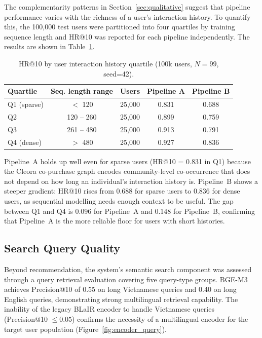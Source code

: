 The complementarity patterns in Section~\ref{sec:qualitative} suggest that pipeline performance varies with the richness of a user's interaction history.
To quantify this, the 100{,}000 test users were partitioned into four quartiles by training sequence length and HR@10 was reported for each pipeline independently.
The results are shown in Table~\ref{tab:perf_by_history}.

\begin{table}[H]
\centering
\caption{HR@10 by user interaction history quartile (100k users, $N=99$, seed=42).}
\label{tab:perf_by_history}
\begin{tabular}{lcccc}
\hline
\textbf{Quartile} & \textbf{Seq. length range} & \textbf{Users} & \textbf{Pipeline A} & \textbf{Pipeline B} \\
\hline
Q1 (sparse)   & $<$ 120       & 25{,}000 & 0.831 & 0.688 \\
Q2            & 120 -- 260    & 25{,}000 & 0.899 & 0.759 \\
Q3            & 261 -- 480    & 25{,}000 & 0.913 & 0.791 \\
Q4 (dense)    & $>$ 480       & 25{,}000 & 0.927 & 0.836 \\
\hline
\end{tabular}
\end{table}

Pipeline~A holds up well even for sparse users (HR@10 = 0.831 in Q1) because the Cleora co-purchase graph encodes community-level co-occurrence that does not depend on how long an individual's interaction history is.
Pipeline~B shows a steeper gradient: HR@10 rises from 0.688 for sparse users to 0.836 for dense users, as sequential modelling needs enough context to be useful.
The gap between Q1 and Q4 is 0.096 for Pipeline~A and 0.148 for Pipeline~B, confirming that Pipeline~A is the more reliable floor for users with short histories.

\subsection{Search Query Quality}

Beyond recommendation, the system's semantic search component was assessed through a query retrieval evaluation covering five query-type groups.
BGE-M3 achieves Precision@10 of 0.55 on long Vietnamese queries and 0.40 on long English queries, demonstrating strong multilingual retrieval capability.
The inability of the legacy BLaIR encoder to handle Vietnamese queries (Precision@10 $\leq 0.05$) confirms the necessity of a multilingual encoder for the target user population (Figure~\ref{fig:encoder_query}).

